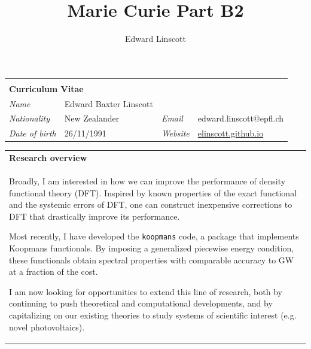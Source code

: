 \documentclass[10pt,a4paper,final]{article}
\author{Edward Linscott}
\title{Marie Curie Part B2}
\begin{document}
\begin{tabularx}{\textwidth}{
      m{}%
      m{}%
      m{}%
      m{}}
   \multicolumn{4}{l}{\cellcolor{seaborn_red}}                                                                                   \\[-1.5em]
   \multicolumn{4}{l}{\cellcolor{seaborn_red}%
      \Huge\textbf{\textcolor{seaborn_bg_grey_half}{Curriculum Vitae}%
      }}                                                                                                                         \\
   \textit{Name         } & Edward Baxter Linscott &                  &                                                          \\
   \textit{Nationality  } & New Zealander          & \textit{Email  } & edward.linscott@epfl.ch                                  \\
   \textit{Date of birth} & 26/11/1991             & \textit{Website} & \href{https://elinscott.github.io/}{elinscott.github.io} \\
\end{tabularx}

\begin{tabularx}{\textwidth}{X}
   \cellcolor{seaborn_blue}\large\textbf{\textcolor{seaborn_bg_grey_half}{Research overview}} \\
   Broadly, I am interested in how we can improve the performance of density functional theory (DFT). Inspired by known properties of the exact functional and the systemic errors of DFT, one can construct inexpensive corrections to DFT that drastically improve its performance.

   Most recently, I have developed the \texttt{koopmans} code, a package that implements Koopmans functionals. By imposing a generalized piecewise energy condition, these functionals obtain spectral properties with comparable accuracy to GW at a fraction of the cost.

   I am now looking for opportunities to extend this line of research, both by continuing to push theoretical and computational developments, and by capitalizing on our existing theories to study systems of scientific interest (e.g. novel photovoltaics).
\end{tabularx}

\setlength{\fboxsep}{5pt}%
\setlength{\fboxrule}{0pt}
\end{document}
